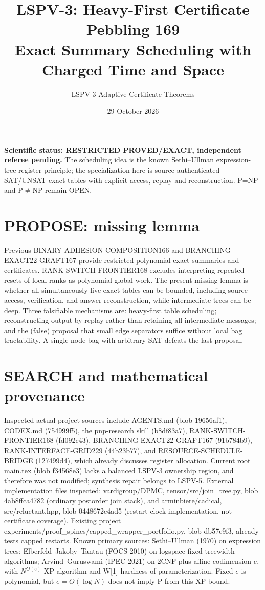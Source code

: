 \documentclass[11pt]{article}
\title{LSPV-3: Heavy-First Certificate Pebbling 169\\
Exact Summary Scheduling with Charged Time and Space}
\author{LSPV-3 Adaptive Certificate Theorems}
\date{29 October 2026}
\begin{document}
\maketitle
\noindent\textbf{Scientific status: RESTRICTED PROVED/EXACT, independent referee pending.}
The scheduling idea is the known Sethi--Ullman expression-tree register principle; the specialization here is source-authenticated SAT/UNSAT exact tables with explicit access, replay and reconstruction. P=NP and P$\ne$NP remain OPEN.

\section{PROPOSE: missing lemma}
Previous BINARY-ADHESION-COMPOSITION166 and BRANCHING-EXACT22-GRAFT167 provide restricted polynomial exact summaries and certificates. RANK-SWITCH-FRONTIER168 excludes interpreting repeated resets of local ranks as polynomial global work. The present missing lemma is whether all simultaneously live exact tables can be bounded, including source access, verification, and answer reconstruction, while intermediate trees can be deep.
Three falsifiable mechanisms are: heavy-first table scheduling; reconstructing output by replay rather than retaining all intermediate messages; and the (false) proposal that small edge separators suffice without local bag tractability. A single-node bag with arbitrary SAT defeats the last proposal.

\section{SEARCH and mathematical provenance}
Inspected actual project sources include AGENTS.md (blob 19656af1), CODEX.md (754999f5), the pnp-research skill (b8df83a7), RANK-SWITCH-FRONTIER168 (fd092c43), BRANCHING-EXACT22-GRAFT167 (91b784b9), RANK-INTERFACE-GRID229 (44b23b77), and RESOURCE-SCHEDULE-BRIDGE (127499d4), which already discusses register allocation. Current root main.tex (blob f34568e3) lacks a balanced LSPV-3 ownership region, and therefore was not modified; synthesis repair belongs to LSPV-5.
External implementation files inspected: vardigroup/DPMC, tensor/src/join_tree.py, blob 4ab8ffca4782 (ordinary postorder join stack), and arminbiere/cadical, src/reluctant.hpp, blob 0448672e4ad5 (restart-clock implementation, not certificate coverage). Existing project experiments/proof_spines/capped_wrapper_portfolio.py, blob db57e9f3, already tests capped restarts. Known primary sources: Sethi--Ullman (1970) on expression trees; Elberfeld--Jakoby--Tantau (FOCS 2010) on logspace fixed-treewidth algorithms; Arvind--Guruswami (IPEC 2021) on 2CNF plus affine codimension $e$, with $N^{O(e)}$ XP algorithm and W[1]-hardness of parameterization. Fixed $e$ is polynomial, but $e=O(\log N)$ does not imply P from this XP bound.
\end{document}
